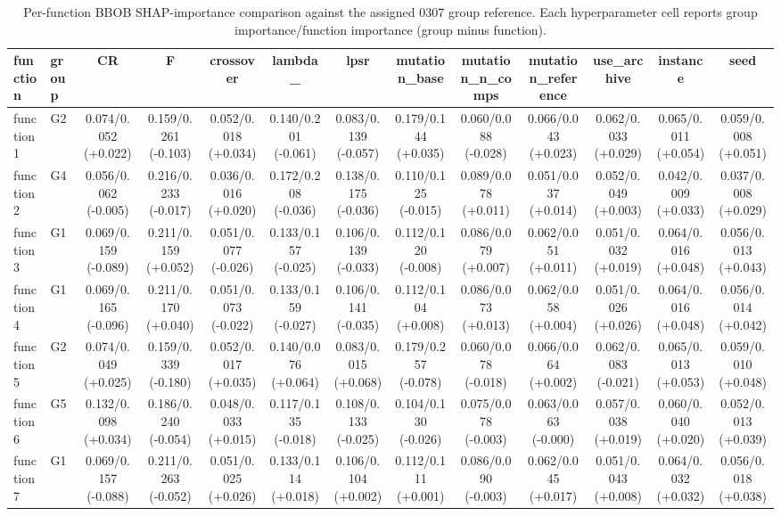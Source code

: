 \begin{table}[htbp]
\centering
\caption{Per-function BBOB SHAP-importance comparison against the assigned 0307 group reference. Each hyperparameter cell reports group importance/function importance (group minus function).}
\label{tab:bbob_function_group_shap_comparison}
\begin{adjustbox}{max width=\textwidth}
\begin{tabular}{llccccccccccc}
\toprule
function & group & CR & F & crossover & lambda\_ & lpsr & mutation\_base & mutation\_n\_comps & mutation\_reference & use\_archive & instance & seed \\
\midrule
function1 & G2 & 0.074/0.052 (+0.022) & 0.159/0.261 (-0.103) & 0.052/0.018 (+0.034) & 0.140/0.201 (-0.061) & 0.083/0.139 (-0.057) & 0.179/0.144 (+0.035) & 0.060/0.088 (-0.028) & 0.066/0.043 (+0.023) & 0.062/0.033 (+0.029) & 0.065/0.011 (+0.054) & 0.059/0.008 (+0.051) \\
function2 & G4 & 0.056/0.062 (-0.005) & 0.216/0.233 (-0.017) & 0.036/0.016 (+0.020) & 0.172/0.208 (-0.036) & 0.138/0.175 (-0.036) & 0.110/0.125 (-0.015) & 0.089/0.078 (+0.011) & 0.051/0.037 (+0.014) & 0.052/0.049 (+0.003) & 0.042/0.009 (+0.033) & 0.037/0.008 (+0.029) \\
function3 & G1 & 0.069/0.159 (-0.089) & 0.211/0.159 (+0.052) & 0.051/0.077 (-0.026) & 0.133/0.157 (-0.025) & 0.106/0.139 (-0.033) & 0.112/0.120 (-0.008) & 0.086/0.079 (+0.007) & 0.062/0.051 (+0.011) & 0.051/0.032 (+0.019) & 0.064/0.016 (+0.048) & 0.056/0.013 (+0.043) \\
function4 & G1 & 0.069/0.165 (-0.096) & 0.211/0.170 (+0.040) & 0.051/0.073 (-0.022) & 0.133/0.159 (-0.027) & 0.106/0.141 (-0.035) & 0.112/0.104 (+0.008) & 0.086/0.073 (+0.013) & 0.062/0.058 (+0.004) & 0.051/0.026 (+0.026) & 0.064/0.016 (+0.048) & 0.056/0.014 (+0.042) \\
function5 & G2 & 0.074/0.049 (+0.025) & 0.159/0.339 (-0.180) & 0.052/0.017 (+0.035) & 0.140/0.076 (+0.064) & 0.083/0.015 (+0.068) & 0.179/0.257 (-0.078) & 0.060/0.078 (-0.018) & 0.066/0.064 (+0.002) & 0.062/0.083 (-0.021) & 0.065/0.013 (+0.053) & 0.059/0.010 (+0.048) \\
function6 & G5 & 0.132/0.098 (+0.034) & 0.186/0.240 (-0.054) & 0.048/0.033 (+0.015) & 0.117/0.135 (-0.018) & 0.108/0.133 (-0.025) & 0.104/0.130 (-0.026) & 0.075/0.078 (-0.003) & 0.063/0.063 (-0.000) & 0.057/0.038 (+0.019) & 0.060/0.040 (+0.020) & 0.052/0.013 (+0.039) \\
function7 & G1 & 0.069/0.157 (-0.088) & 0.211/0.263 (-0.052) & 0.051/0.025 (+0.026) & 0.133/0.114 (+0.018) & 0.106/0.104 (+0.002) & 0.112/0.111 (+0.001) & 0.086/0.090 (-0.003) & 0.062/0.045 (+0.017) & 0.051/0.043 (+0.008) & 0.064/0.032 (+0.032) & 0.056/0.018 (+0.038) \\

\end{tabular}
\end{adjustbox}
\end{table}
